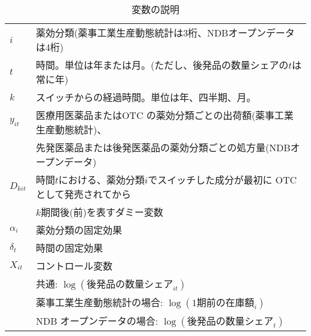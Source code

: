 \documentclass[a4paper,11pt,uplatex]{jsarticle}
\theoremstyle{definition}
\begin{document}
\begin{table}[H] \caption{変数の説明}\label{tab:event}
    \begin{tabular}{ll}
       \toprule 
       \(i\)&薬効分類(薬事工業生産動態統計は3桁、NDBオープンデータは4桁)\\
       \(t\)&時間。単位は年または月。(ただし、後発品の数量シェアの\(t\)は常に年)\\
       \(k\)&スイッチからの経過時間。単位は年、四半期、月。\\
    $y_{it}$ & 医療用医薬品またはOTC の薬効分類ごとの出荷額(薬事工業生産動態統計)、\\
    & 先発医薬品または後発医薬品の薬効分類ごとの処方量(NDBオープンデータ)\\
    $D_{kit}$ & 時間\(t\)における、薬効分類\(i\)でスイッチした成分が最初に OTC として発売されてから\\
    & \(k\)期間後(前)を表すダミー変数\\
    $\alpha_i$ & 薬効分類の固定効果\\
    $\delta_t$ & 時間の固定効果\\
    $X_{it}$ & コントロール変数\\
    & 共通: $\log(後発品の数量シェア_{it})$\\
    & 薬事工業生産動態統計の場合: $\log(1期前の在庫額_i)$\\
    & \textrm{NDB} オープンデータの場合: $\log(後発品の数量シェア_t)$ \\
    \bottomrule
    \end{tabular}
\end{table}
\end{document}
